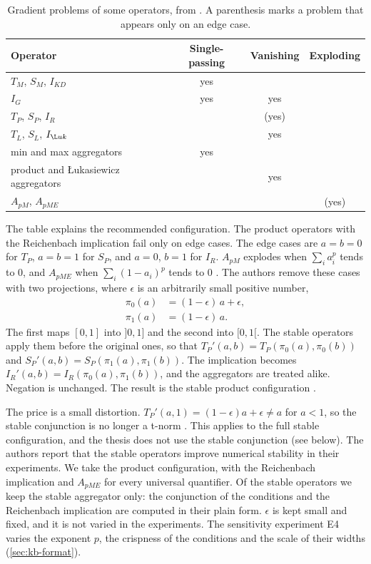 \begin{table}[htbp]
\centering
\footnotesize
\caption{Gradient problems of some operators, from
\citet{badreddine2022ltn}. A parenthesis marks a problem that appears only on
an edge case.}
\label{tab:gradient-problems}
\begin{tabular}{@{}lccc@{}}
\toprule
Operator & Single-passing & Vanishing & Exploding \\
\midrule
$T_M$, $S_M$, $I_{KD}$ & yes & & \\
$I_G$ & yes & yes & \\
$T_P$, $S_P$, $I_R$ & & (yes) & \\
$T_L$, $S_L$, $I_{\L uk}$ & & yes & \\
min and max aggregators & yes & & \\
product and {\L}ukasiewicz aggregators & & yes & \\
$A_{pM}$, $A_{pME}$ & & & (yes) \\
\bottomrule
\end{tabular}
\end{table}

The table explains the recommended configuration. The product operators with
the Reichenbach implication fail only on edge cases. The edge cases are
$a=b=0$ for $T_P$, $a=b=1$ for $S_P$, and $a=0$, $b=1$ for $I_R$. $A_{pM}$
explodes when $\sum_i a_i^{p}$ tends to $0$, and $A_{pME}$ when
$\sum_i(1-a_i)^{p}$ tends to $0$ \citep{badreddine2022ltn}. The authors remove
these cases with two projections, where $\epsilon$ is an arbitrarily small
positive number,
\begin{align}
\pi_0(a) &= (1-\epsilon)\,a+\epsilon, \\
\pi_1(a) &= (1-\epsilon)\,a.
\end{align}
The first maps $[0,1]$ into $]0,1]$ and the second into $[0,1[$. The stable
operators apply them before the original ones, so that $T_P'(a,b)=
T_P(\pi_0(a),\pi_0(b))$ and $S_P'(a,b)=S_P(\pi_1(a),\pi_1(b))$. The
implication becomes $I_R'(a,b)=I_R(\pi_0(a),\pi_1(b))$, and the aggregators
are treated alike. Negation is unchanged. The result is the stable product
configuration \citep{badreddine2022ltn}.

The price is a small distortion. $T_P'(a,1)=(1-\epsilon)a+\epsilon\neq a$ for
$a<1$, so the stable conjunction is no longer a t-norm
\citep{badreddine2022ltn}. This applies to the full stable configuration, and
the thesis does not use the stable conjunction (see below). The authors report that the stable operators
improve numerical stability in their experiments. We take the product
configuration, with the Reichenbach implication and $A_{pME}$ for every
universal quantifier. Of the stable operators we keep the stable aggregator
only: the conjunction of the conditions and the Reichenbach implication are
computed in their plain form. $\epsilon$ is kept small and fixed, and it is not
varied in the experiments. The sensitivity experiment E4 varies the exponent
$p$, the crispness of the conditions and the scale of their widths
(\cref{sec:kb-format}).

